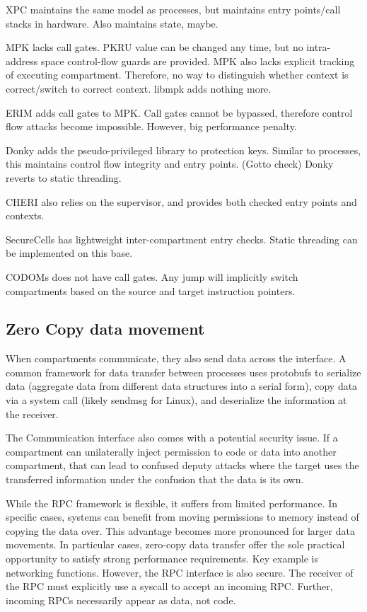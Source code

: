 XPC maintains the same model as processes, but maintains entry points/call
stacks in hardware.
Also maintains state, maybe.

MPK lacks call gates. 
PKRU value can be changed any time, but no intra-address space control-flow
guards are provided.
MPK also lacks explicit tracking of executing compartment.
Therefore, no way to distinguish whether context is correct/switch to correct
context.
libmpk adds nothing more.

ERIM adds call gates to MPK.
Call gates cannot be bypassed, therefore control flow attacks become impossible.
However, big performance penalty.

Donky adds the pseudo-privileged library to protection keys.
Similar to processes, this maintains control flow integrity and entry points.
(Gotto check) Donky reverts to static threading.

CHERI also relies on the supervisor, and provides both checked entry points
and contexts.

SecureCells has lightweight inter-compartment entry checks.
Static threading can be implemented on this base.

CODOMs does not have call gates. 
Any jump will implicitly switch compartments based on the source and target
instruction pointers.

\subsection{Zero Copy data movement}

When compartments communicate, they also send data across the interface.
A common framework for data transfer between processes uses protobufs
to serialize data (aggregate data from different data structures into
a serial form), copy data via a system call (likely sendmsg for Linux),
and deserialize the information at the receiver.

The Communication interface also comes with a potential security
issue.
If a compartment can unilaterally inject permission to code or data
into another compartment, that can lead to confused deputy attacks where
the target uses the transferred information under the confusion that the
data is its own. 

While the RPC framework is flexible, it suffers from limited performance.
In specific cases, systems can benefit from moving permissions to memory
instead of copying the data over.
This advantage becomes more pronounced for larger data movements.
In particular cases, zero-copy data transfer offer the sole practical
opportunity to satisfy strong performance requirements. 
Key example is networking functions.
However, the RPC interface is also secure. 
The receiver of the RPC must explicitly use a syscall to accept an 
incoming RPC.
Further, incoming RPCs necessarily appear as data, not code.


